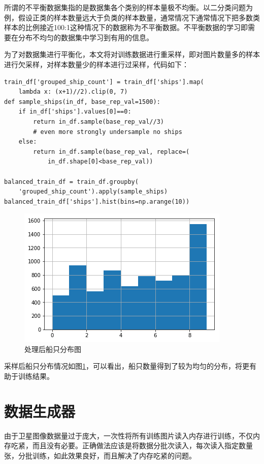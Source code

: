 所谓的不平衡数据集指的是数据集各个类别的样本量极不均衡。以二分类问题为例，假设正类的样本数量远大于负类的样本数量，通常情况下通常情况下把多数类样本的比例接近100:1这种情况下的数据称为不平衡数据。不平衡数据的学习即需要在分布不均匀的数据集中学习到有用的信息。

为了对数据集进行平衡化，本文将对训练数据进行重采样，即对图片数量多的样本进行欠采样，对样本数量少的样本进行过采样，代码如下：

\begin{lstlisting}
train_df['grouped_ship_count'] = train_df['ships'].map(
    lambda x: (x+1)//2).clip(0, 7)
def sample_ships(in_df, base_rep_val=1500):
    if in_df['ships'].values[0]==0:
        return in_df.sample(base_rep_val//3)
        # even more strongly undersample no ships
    else:
        return in_df.sample(base_rep_val, replace=(
            in_df.shape[0]<base_rep_val))
    
balanced_train_df = train_df.groupby(
    'grouped_ship_count').apply(sample_ships)
balanced_train_df['ships'].hist(bins=np.arange(10))
\end{lstlisting}

\begin{figure}[htbp]
\centering
\includegraphics[width=0.7\linewidth]{body/preprocessing_pic/5}
\caption{处理后船只分布图}
\label{fig::preprocessing5}
\end{figure}

采样后船只分布情况如图\ref{fig::preprocessing5}，可以看出，船只数量得到了较为均匀的分布，将更有助于训练结果。

\section{数据生成器}

由于卫星图像数据量过于庞大，一次性将所有训练图片读入内存进行训练，不仅内存吃紧，而且没有必要。正确做法应该是将数据分批次读入，每次读入指定数量张，分批训练，如此效果良好，而且解决了内存吃紧的问题。

